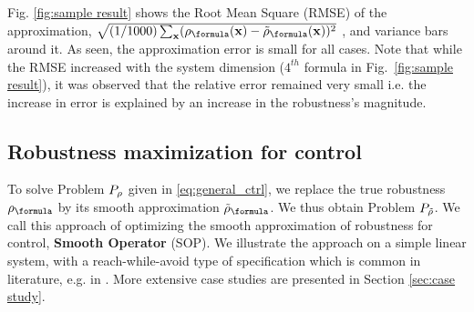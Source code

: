 Fig. \ref{fig:sample result} shows the Root Mean Square (RMSE) of the approximation, $\sqrt{(1/1000)\sum_{\sstraj}(\robf(\sstraj)-\srobf(\sstraj))^2}$
, and variance bars around it. 
As seen, the approximation error is small for all cases.
Note that while the RMSE  increased with the system dimension ($4^{th}$ formula in Fig.~\ref{fig:sample result}), it was observed that the relative error remained very small i.e. the increase in error is explained by an increase in the robustness's magnitude. 





\subsection{Robustness maximization for control}
\label{sec:toy example}
To solve Problem $P_\rho$ given in \eqref{eq:general_ctrl}, we replace the true robustness $\robf$ by its smooth approximation $\srobf$.
We thus obtain Problem $P_{\tilde{\rho}}$. We call this approach of optimizing the smooth approximation of robustness for control, \textbf{Smooth Operator} (SOP).
We illustrate the approach on a simple linear system, with a reach-while-avoid type of specification which is common in literature, e.g. in \cite{Saha_acc16}. More extensive case studies are presented in Section \ref{sec:case study}.

